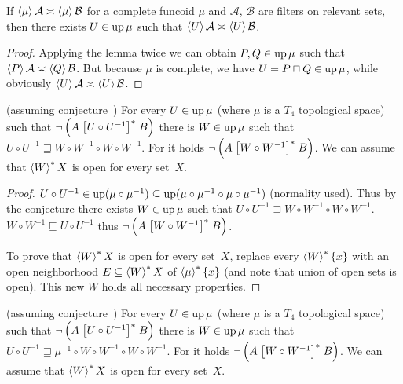\begin{cor}\label{disj-mu}
  If $\left\langle \mu\right\rangle \mathcal{A} \asymp \left\langle \mu\right\rangle
  \mathcal{B}$ for a complete funcoid $\mu$ and $\mathcal{A}$,
  $\mathcal{B}$ are filters on relevant sets, then there exists $U \in
  \operatorname{up} \mu$ such that $\left\langle U\right\rangle \mathcal{A} \asymp \left\langle U\right\rangle \mathcal{B}$.
\end{cor}

\begin{proof}
  Applying the lemma twice we can obtain $P, Q \in \operatorname{up} \mu$
  such that $\left\langle P\right\rangle \mathcal{A} \asymp \left\langle Q\right\rangle \mathcal{B}$. But because
  $\mu$ is complete, we have $U = P \sqcap Q \in \operatorname{up} \mu$,
  while obviously $\left\langle U\right\rangle \mathcal{A} \asymp \left\langle U\right\rangle \mathcal{B}$.
\end{proof}

\begin{lem}
  (assuming conjecture~) For every $U \in \operatorname{up} \mu$ (where $\mu$ is a $T_4$ topological space) such that
  $\neg \left( A \mathrel{\left[U \circ U^{- 1}\right]^{\ast}} B \right)$ there is $W \in
  \operatorname{up} \mu$ such that $U \circ U^{- 1} \sqsupseteq W \circ W^{- 1}
  \circ W \circ W^{- 1}$. For it holds $\neg \left( A \mathrel{\left[W \circ W^{-
  1}\right]^{\ast}} B \right)$.
  We can assume that $\left\langle W\right\rangle ^{\ast}X$ is open for every set~$X$.
\end{lem}

\begin{proof}
  $U \circ U^{- 1} \in \operatorname{up} (\mu \circ \mu^{- 1}) \subseteq
  \operatorname{up} (\mu \circ \mu^{- 1} \circ \mu \circ
  \mu^{- 1})$ (normality used). Thus by the conjecture there exists $W
  \in \operatorname{up} \mu$ such that $U \circ U^{- 1} \sqsupseteq W \circ W^{-
  1} \circ W \circ W^{- 1}$. $W \circ W^{- 1} \sqsubseteq U \circ U^{- 1}$
  thus $\neg \left( A \mathrel{\left[W \circ W^{- 1}\right]^{\ast}} B \right)$.
  
  To prove that $\left\langle W\right\rangle ^{\ast}X$ is open for every set~$X$, replace every $\left\langle W\right\rangle ^{\ast}\{x\}$
  with an open neighborhood $E\subseteq\left\langle W\right\rangle ^{\ast}X$ of $\left\langle \mu\right\rangle ^{\ast}\{x\}$
  (and note that union of open sets is open).
  This new $W$ holds all necessary properties.
\end{proof}

\begin{lem}
  (assuming conjecture~) For every $U \in \operatorname{up} \mu$ (where $\mu$ is a $T_4$ topological space) such that
  $\neg \left( A \mathrel{\left[U \circ U^{- 1}\right]^{\ast}} B \right)$ there is $W \in \operatorname{up}\mu$
  such that $U \circ U^{- 1} \sqsupseteq \mu^{-1} \circ W \circ W^{-1}\circ W \circ W^{- 1}$.
  For it holds $\neg \left( A \mathrel{\left[W \circ W^{-
  1}\right]^{\ast}} B \right)$.
  We can assume that $\left\langle W\right\rangle ^{\ast}X$ is open for every set~$X$.
\end{lem}


